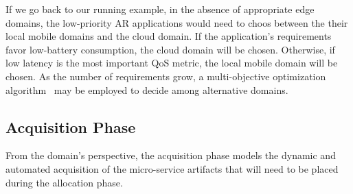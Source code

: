 

If we go back to our running example, in the absence of appropriate edge domains, the low-priority AR applications would need to choos between the their local mobile domains and the cloud domain. If the application's requirements favor low-battery consumption, the cloud domain will be chosen. Otherwise, if low latency is the most important QoS metric, the local mobile domain will be chosen. As the number of requirements grow, a multi-objective optimization algorithm~\cite{Olson1996} may be employed to decide among alternative domains.







\subsection*{Acquisition Phase}\label{sec:A3-E-acquisition}


From the domain's perspective, the acquisition phase models the dynamic and automated acquisition of the micro-service artifacts that will need to be placed during the allocation phase. 

